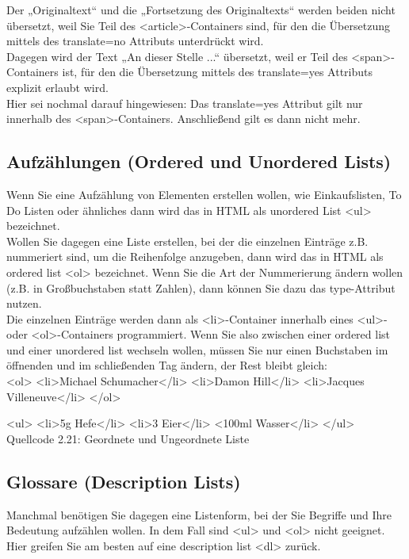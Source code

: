 Der „Originaltext“ und die „Fortsetzung des Originaltexts“ werden beiden nicht übersetzt, weil Sie Teil des <article>-Containers sind, für den die Übersetzung mittels des translate=no Attributs unterdrückt wird.\\

Dagegen wird der Text „An dieser Stelle ...“ übersetzt, weil er Teil des <span>-Containers ist, für den die Übersetzung mittels des translate=yes Attributs explizit erlaubt wird.\\

Hier sei nochmal darauf hingewiesen: Das translate=yes Attribut gilt nur innerhalb des <span>-Containers. Anschließend gilt es dann nicht mehr. 

\subsection{Aufzählungen (Ordered und Unordered Lists)}

Wenn Sie eine Aufzählung von Elementen erstellen wollen, wie Einkaufslisten, To Do Listen oder ähnliches dann wird das in HTML als unordered List <ul> bezeichnet. \\

Wollen Sie dagegen eine Liste erstellen, bei der die einzelnen Einträge z.B. nummeriert sind, um die Reihenfolge anzugeben, dann wird das in HTML als ordered list <ol> bezeichnet. Wenn Sie die Art der Nummerierung ändern wollen (z.B. in Großbuchstaben statt Zahlen), dann können Sie dazu das type-Attribut nutzen.\\

Die einzelnen Einträge werden dann als <li>-Container innerhalb eines <ul>- oder <ol>-Containers programmiert. Wenn Sie also zwischen einer ordered list und einer unordered list wechseln wollen, müssen Sie nur einen Buchstaben im öffnenden und im schließenden Tag ändern, der Rest bleibt gleich:\\

<ol>
<li>Michael Schumacher</li>
<li>Damon Hill</li>
<li>Jacques Villeneuve</li>
</ol>

<ul>
<li>5g Hefe</li>
<li>3 Eier</li>
<100ml Wasser</li>
</ul>
Quellcode 2.21: Geordnete und Ungeordnete Liste

\subsection{Glossare (Description Lists)}

Manchmal benötigen Sie dagegen eine Listenform, bei der Sie Begriffe und Ihre Bedeutung aufzählen wollen. In dem Fall sind <ul> und <ol> nicht geeignet. Hier greifen Sie am besten auf eine description list <dl> zurück.\\


